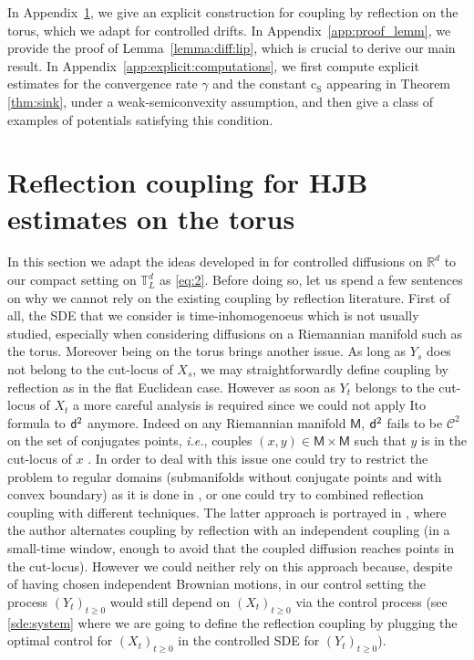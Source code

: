 \documentclass[final,12pt]{colt2023} %
\def\ie{\textit{i.e.}}
\newcommand{\bbRD}{\mathbb{R}^d}
\newcommand{\sfd}{{\sf d}}
\def\ie{\textit{i.e.}}
\def\cconst{\mathrm{c}_{\mathrm{S}}}
\def\msm{\mathsf{M}}
\begin{document}
In Appendix~\ref{app:gio}, we give an explicit construction for coupling by reflection on the torus, which we adapt for controlled drifts. In Appendix~\ref{app:proof_lemm}, we provide the proof of Lemma~\ref{lemma:diff:lip}, which is crucial to derive our main result. In Appendix~\ref{app:explicit:computations}, we first compute explicit estimates for the convergence rate $\gamma$ and the constant $\cconst$ appearing in Theorem \ref{thm:sink}, under a weak-semiconvexity assumption, and then give a class of examples of potentials satisfying this condition.



\section{Reflection coupling for HJB estimates on the torus}\label{app:gio}
In this section we adapt the ideas developed in \cite{conforti2022coupling} for controlled diffusions on $\bbRD$ to our compact setting on $\mathbb{T}_L^d$ as \eqref{eq:2}. Before doing so, let us spend a few sentences on why we cannot rely on the existing coupling by reflection literature. First of all, the SDE that we consider is time-inhomogenoeus which is not usually studied, especially when considering diffusions on a Riemannian manifold such as the torus. Moreover being on the torus brings another issue. As long as $Y_s$ does not belong to the cut-locus of $X_s$, we may straightforwardly define coupling by reflection as in the flat Euclidean case.
However as soon as $Y_t$ belongs to the cut-locus of $X_t$ a more careful analysis is required since we could not apply Ito formula to $\sfd^2$ anymore. Indeed on any Riemannian manifold  $\msm$, $\sfd^2$ fails to be $\mathcal{C}^2$ on the set of conjugates points, \ie, couples $(x,y)\in \msm\times \msm$ such that $y$ is in the cut-locus of $x$ \cite[Chapter 5.9.1]{petersen2006Riemannian}. In order to deal with this issue one could try to restrict the problem to regular domains (submanifolds without conjugate points and with convex boundary) as it is done in \cite{wang1994neumann}, or one could try to combined reflection coupling with different techniques. The latter approach is portrayed in \cite{cranston91}, where the author alternates coupling by reflection with an independent coupling (in a small-time window, enough to avoid that the coupled diffusion reaches points in the cut-locus). However we could neither rely on this approach because, despite of having chosen independent Brownian motions, in our control setting the process $(Y_t)_{t \geq 0}$ would still depend on $(X_t)_{t \geq 0}$ via the control process (see \eqref{sde:system} where we are going to define the reflection coupling by plugging the optimal control for $(X_t)_{t \geq 0}$ in the controlled SDE for $(Y_t)_{t \geq 0}$).  
\end{document}
